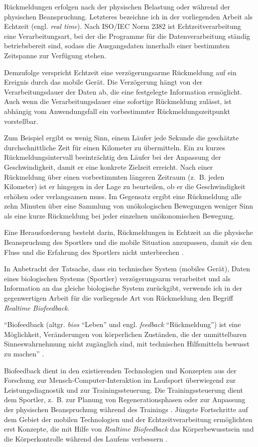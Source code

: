 Rückmeldungen erfolgen nach der physischen Belastung oder während der physischen Beanspruchung. Letzteres bezeichne ich in der vorliegenden Arbeit als Echtzeit (engl. \emph{real time}). Nach ISO/IEC Norm 2382 ist Echtzeitverarbeitung eine Verarbeitungsart, bei der die Programme für die Datenverarbeitung ständig betriebsbereit sind, sodass die Ausgangsdaten innerhalb einer bestimmten Zeitspanne zur Verfügung stehen.

Demzufolge verspricht Echtzeit eine verzögerungsarme Rückmeldung auf ein Ereignis durch das mobile Gerät. Die Verzögerung hängt von der Verarbeitungsdauer der Daten ab, die eine festgelegte Information ermöglicht. Auch wenn die Verarbeitungsdauer eine sofortige Rückmeldung zulässt, ist abhängig vom Anwendungsfall ein vorbestimmter Rückmeldungszeitpunkt vorstellbar.

Zum Beispiel ergibt es wenig Sinn, einem Läufer jede Sekunde die geschätzte durchschnittliche Zeit für einen Kilometer zu übermitteln. Ein zu kurzes Rückmeldungsintervall beeinträchtig den Läufer bei der Anpassung der Geschwindigkeit, damit er eine konkrete Zielzeit erreicht. Nach einer Rückmeldung über einen vorbestimmten längeren Zeitraum (z.~B. jeden Kilometer) ist er hingegen in der Lage zu beurteilen, ob er die Geschwindigkeit erhöhen oder verlangsamen muss. Im Gegensatz ergibt eine Rückmeldung alle zehn Minuten über eine Sammlung von unökologischen Bewegungen weniger Sinn als eine kurze Rückmeldung bei jeder einzelnen unökonomischen Bewegung.

Eine Herausforderung besteht darin, Rückmeldungen in Echtzeit an die physische Beanspruchung des Sportlers und die mobile Situation anzupassen, damit sie den Fluss und die Erfahrung des Sportlers nicht unterbrechen \citep[vgl.][]{Nylander2014}.

In Anbetracht der Tatsache, dass ein technisches System (mobiles Gerät), Daten eines biologischen Systems (Sportler) verzögerungsarm verarbeitet und als Information an das gleiche biologische System zurückgibt, verwende ich in der gegenwertigen Arbeit für die vorliegende Art von Rückmeldung den Begriff \emph{Realtime Biofeedback}.

"`Biofeedback (altgr. \emph{bios} "`Leben"' und engl. \emph{feedback} "`Rückmeldung"') ist eine Möglichkeit, Veränderungen von körperlichen Zuständen, die der unmittelbaren Sinneswahrnehmung nicht zugänglich sind, mit technischen Hilfsmitteln bewusst zu machen"' \citep[][S.~483]{Riemer2015}.

Biofeedback dient in den existierenden Technologien und Konzepten aus der Forschung zur Mensch-Computer-Interaktion im Laufsport überwiegend zur Leistungsdiagnostik und zur Trainingssteuerung. Die Trainingssteuerung dient dem Sportler, z.~B. zur Planung von Regenerationsphasen oder zur Anpassung der physischen Beanspruchung während des Trainings \citep[vgl.][S.~81-107]{Marquardt2011}. Jüngste Fortschritte auf dem Gebiet der mobilen Technologien und der Echtzeitverarbeitung ermöglichten erst Konzepte, die mit Hilfe von \emph{Realtime Biofeedback} das Körperbewusstsein und die Körperkontrolle während des Laufens verbessern \citep[z.~B.][]{Strohrmann2013, Strohrmann2013a, Strohrmann2014}.

